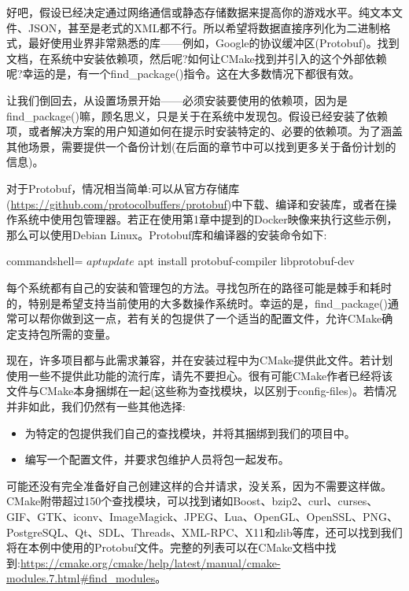 好吧，假设已经决定通过网络通信或静态存储数据来提高你的游戏水平。纯文本文件、JSON，甚至是老式的XML都不行。所以希望将数据直接序列化为二进制格式，最好使用业界非常熟悉的库——例如，Google的协议缓冲区(Protobuf)。找到文档，在系统中安装依赖项，然后呢?如何让CMake找到并引入的这个外部依赖呢?幸运的是，有一个find\_package()指令。这在大多数情况下都很有效。

让我们倒回去，从设置场景开始——必须安装要使用的依赖项，因为是find\_package()嘛，顾名思义，只是关于在系统中发现包。假设已经安装了依赖项，或者解决方案的用户知道如何在提示时安装特定的、必要的依赖项。为了涵盖其他场景，需要提供一个备份计划(在后面的章节中可以找到更多关于备份计划的信息)。

对于Protobuf，情况相当简单:可以从官方存储库(\url{https://github.com/protocolbuffers/protobuf})中下载、编译和安装库，或者在操作系统中使用包管理器。若正在使用第1章中提到的Docker映像来执行这些示例，那么可以使用Debian Linux。Protobuf库和编译器的安装命令如下:

\begin{tcblisting}{commandshell={}}
$ apt update
$ apt install protobuf-compiler libprotobuf-dev
\end{tcblisting}

每个系统都有自己的安装和管理包的方法。寻找包所在的路径可能是棘手和耗时的，特别是希望支持当前使用的大多数操作系统时。幸运的是，find\_package()通常可以帮你做到这一点，若有关的包提供了一个适当的配置文件，允许CMake确定支持包所需的变量。

现在，许多项目都与此需求兼容，并在安装过程中为CMake提供此文件。若计划使用一些不提供此功能的流行库，请先不要担心。很有可能CMake作者已经将该文件与CMake本身捆绑在一起(这些称为查找模块，以区别于config-files)。若情况并非如此，我们仍然有一些其他选择:

\begin{itemize}
\item 
为特定的包提供我们自己的查找模块，并将其捆绑到我们的项目中。

\item 
编写一个配置文件，并要求包维护人员将包一起发布。
\end{itemize}

可能还没有完全准备好自己创建这样的合并请求，没关系，因为不需要这样做。CMake附带超过150个查找模块，可以找到诸如Boost、bzip2、curl、curses、GIF、GTK、iconv、ImageMagick、JPEG、Lua、OpenGL、OpenSSL、PNG、PostgreSQL、Qt、SDL、Threads、XML-RPC、X11和zlib等库，还可以找到我们将在本例中使用的Protobuf文件。完整的列表可以在CMake文档中找到:\url{https://cmake.org/cmake/help/latest/manual/cmake-modules.7.html\#find_modules}。

